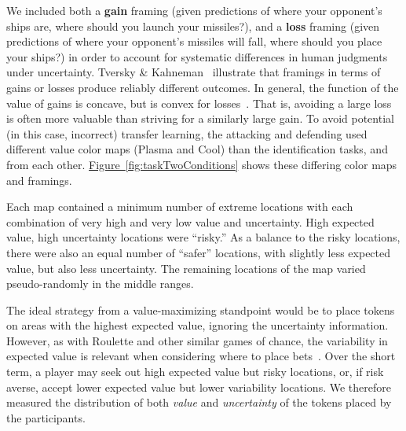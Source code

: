\documentclass{vgtc}                          %
\newcommand{\figref}[1]{\hyperref[#1]{Figure~\ref*{#1}}}
\begin{document}
We included both a \textbf{gain} framing (given predictions of where your opponent's ships are, where should you launch your missiles?), and a \textbf{loss} framing (given predictions of where your opponent's missiles will fall, where should you place your ships?) in order to account for systematic differences in human judgments under uncertainty. Tversky \& Kahneman~\cite{tversky1985framing} illustrate that framings in terms of gains or losses produce reliably different outcomes. In general, the function of the value of gains is concave, but is convex for losses~\cite{kahneman1979prospect}. That is, avoiding a large loss is often more valuable than striving for a similarly large gain. To avoid potential (in this case, incorrect) transfer learning, the attacking and defending used different value color maps (Plasma and Cool) than the identification tasks, and from each other.  \figref{fig:taskTwoConditions} shows these differing color maps and framings.

Each map contained a minimum number of extreme locations with each combination of very high and very low value and uncertainty. High expected value, high uncertainty locations were ``risky.'' As a balance to the risky locations, there were also an equal number of ``safer'' locations, with slightly less expected value, but also less uncertainty. The remaining locations of the map varied pseudo-randomly in the middle ranges.

The ideal strategy from a value-maximizing standpoint would be to place tokens on areas with the highest expected value, ignoring the uncertainty information. However, as with Roulette and other similar games of chance, the variability in expected value is relevant when considering where to place bets~\cite{mlodinow2009drunkard}. Over the short term, a player may seek out high expected value but risky locations, or, if risk averse, accept lower expected value but lower variability locations. We therefore measured the distribution of both \emph{value} and \emph{uncertainty} of the tokens placed by the participants. 



\end{document}
